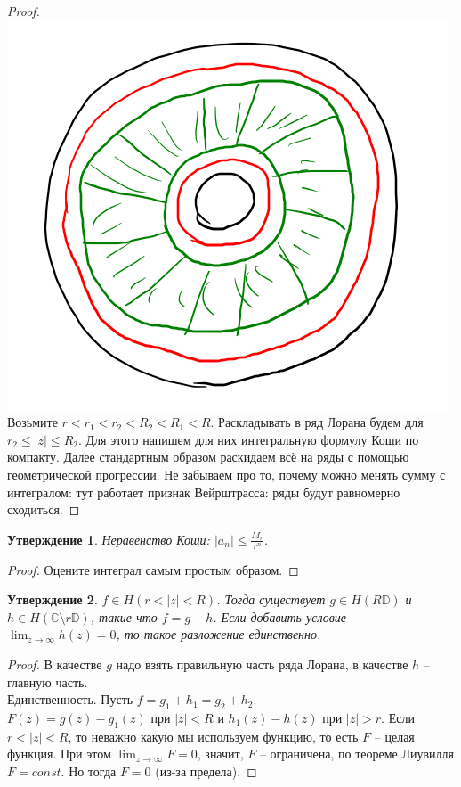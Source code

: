 \documentclass[12pt, letterpaper]{article}
\newtheorem{prop}{Утверждение}[section]
\begin{document}
\begin{proof}
\includegraphics[scale=0.6]{1.png}\\
Возьмите $r < r_1 < r_2 < R_2 < R_1 < R$. Раскладывать в ряд Лорана будем для $r_2 \leq |z| \leq R_2$. Для этого напишем для них интегральную формулу Коши по компакту. Далее стандартным образом раскидаем всё на ряды с помощью геометрической прогрессии. Не забываем про то, почему можно менять сумму с интегралом: тут работает признак Вейрштрасса: ряды будут равномерно сходиться.
\end{proof}
\begin{prop}
Неравенство Коши: $|a_n| \leq \frac{M_r}{r^n}$. 
\end{prop}
\begin{proof}
Оцените интеграл самым простым образом.
\end{proof}
\begin{prop}
$f \in H(r < |z| < R)$. Тогда существует $g \in H(R\mathbb{D})$ и $h \in H(\mathbb{C} \setminus r\mathbb{D})$, такие что $f = g + h$. Если добавить условие $\lim_{z \rightarrow \infty} h(z) = 0$, то такое разложение единственно.
\end{prop}
\begin{proof}
В качестве $g$ надо взять правильную часть ряда Лорана, в качестве $h$ -- главную часть. \\
Единственность. Пусть $f = g_1 + h_1 = g_2 + h_2$. \\
$F(z) = g(z)-g_1(z)$ при $|z| < R$ и $h_1(z) - h(z)$ при $|z| > r$. Если $r < |z| < R$, то неважно какую мы используем функцию, то есть $F$ -- целая функция. При этом $\lim_{z \rightarrow \infty} F = 0$, значит, $F$ -- ограничена, по теореме Лиувилля $F = const$. Но тогда $F = 0$ (из-за предела).   
\end{proof}
\end{document}

